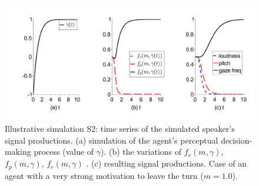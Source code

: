 \begin{figure}
  \centering
  \includegraphics[width=\linewidth]{figure/signals_simu_s2b.pdf}
  \caption{Illustrative simulation S2: time series of the simulated speaker's signal productions. (a) simulation of the agent's perceptual decision-making process (value of $\gamma$). (b) the variations of $f_v(m,\gamma)$, $f_p(m,\gamma)$, $f_r(m,\gamma)$ . (c) resulting  signal productions. Case of an agent with a very strong motivation to leave the turn ($m=1.0$).}
  \label{demo_simu}
\end{figure}
